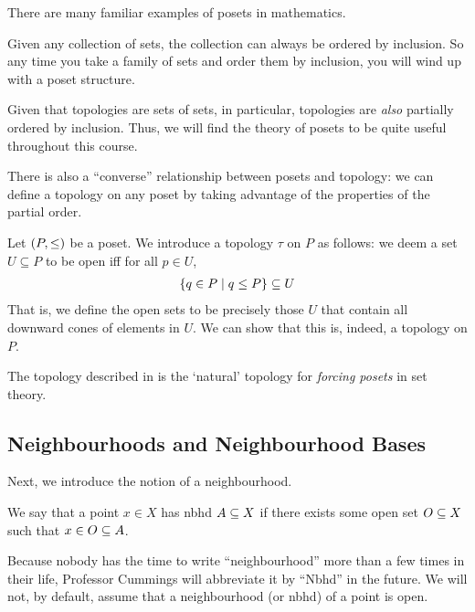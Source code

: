 There are many familiar examples of posets in mathematics.

\begin{boxexample}
    Given any collection of sets, the collection can always be ordered by inclusion. So any time you take a family of sets and order them by inclusion, you will wind up with a poset structure.
\end{boxexample}

Given that topologies are sets of sets, in particular, topologies are \textit{also} partially ordered by inclusion. Thus, we will find the theory of posets to be quite useful throughout this course.

There is also a ``converse'' relationship between posets and topology: we can define a topology on any poset by taking advantage of the properties of the partial order.

\begin{boxexample}\label{Ch1:Eg:Poset_Downward_Cone}
    Let $\left( P, \leq \right)$ be a poset. We introduce a topology $\tau$ on $P$ as follows: we deem a set $U \subseteq P$ to be open iff for all $p \in U$,
    \begin{align*}
        \left\{ q \in P \; \middle\vert \; q \leq P \right\} \subseteq U
    \end{align*}
    That is, we define the open sets to be precisely those $U$ that contain all downward cones of elements in $U$. We can show that this is, indeed, a topology on $P$.
\end{boxexample}

The topology described in  is the `natural' topology for \textit{forcing posets} in set theory.

\subsection{Neighbourhoods and Neighbourhood Bases}

Next, we introduce the notion of a neighbourhood.

\begin{boxdefinition}[Nbhd]%
    We say that a point $x\in X$ has nbhd $A\subseteq X$ if there exists some open set $O\subseteq X$ such that $x\in O \subseteq A$.
\end{boxdefinition}

\begin{boxabbrev} 
    Because nobody has the time to write ``neighbourhood'' more than a few times in their life, Professor Cummings will abbreviate it by ``Nbhd'' in the future. We will not, by default, assume that a neighbourhood (or nbhd) of a point is open.
\end{boxabbrev}

